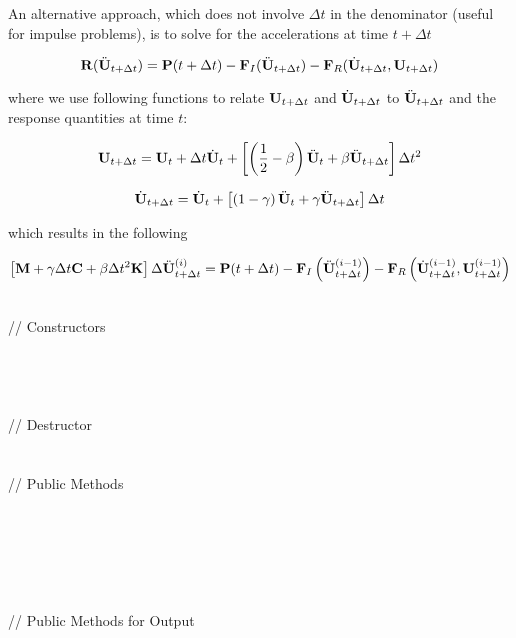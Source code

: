 \noindent An alternative approach, which does not involve $\Delta t$
in the denominator (useful for impulse problems), is to solve for the
accelerations at time $t + \Delta t$ 

\[ {\bf R} (\ddot{\bf U}_{t + \Delta t}) = {\bf P}(t + \Delta t) - {\bf F}_I(\ddot{\bf U}_{t+\Delta t})
- {\bf F}_R(\dot{\bf U}_{t + \Delta t},{\bf U}_{t + \Delta t}) \]

\noindent where we use following functions to relate ${\bf U}_{t + \Delta
t}$ and $\dot{\bf U}_{t + \Delta t}$ to $\ddot{\bf U}_{t + \Delta t}$ and the response
quantities at time $t$:

\[
{\bf U}_{t + \Delta t} = {\bf U}_t + \Delta t \dot{\bf U}_t + \left[
\left(\frac{1}{2} - \beta\right)\ddot{\bf U}_t + \beta \ddot{\bf U}_{t + \Delta
t}\right] \Delta t^2
\]

\[
\dot{\bf U}_{t + \Delta t} = \dot{\bf U}_t + \left[ \left(1 - \gamma\right)\ddot{\bf U}_t +
\gamma\ddot{\bf U}_{t + \Delta t}\right] \Delta t
\]

\noindent which results in the following 

\[ \left[ {\bf M} + \gamma \Delta t {\bf C} + \beta \Delta t^2 {\bf K} \right] \Delta
\ddot{\bf U}_{t + \Delta t}^{(i)} = {\bf P}(t + \Delta t) - {\bf F}_I\left(\ddot{\bf U}_{t+\Delta 
t}^{(i-1)}\right)
- {\bf F}_R\left(\dot{\bf U}_{t + \Delta t}^{(i-1)},{\bf U}_{t + \Delta
t}^{(i-1)}\right) \]


\pagebreak
{} \\
\indent // Constructors \\
\\ 
\\ 
\\ \\
\indent // Destructor \\
\\ \\
\indent // Public Methods \\
 \\
 \\
\\
\\
 \\ \\
\indent // Public Methods for Output\\
\\ 
\\ 
\\


